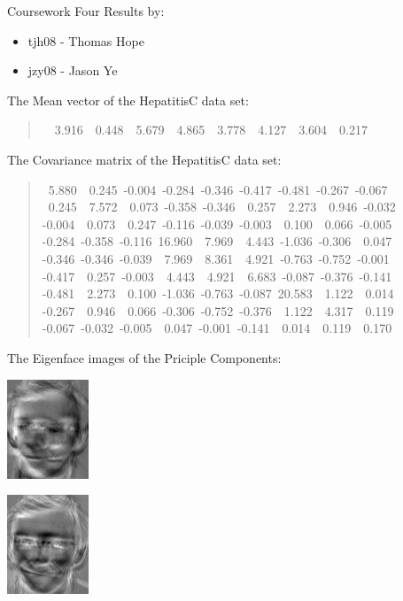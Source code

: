 \documentclass[a4paper]{article}
\begin{document}
Coursework Four Results by:
%
\begin{itemize}

\item tjh08 - Thomas Hope

\item jzy08 - Jason Ye

\end{itemize}

The Mean vector of the HepatitisC data set:
%
\begin{quote}{\ttfamily \raggedright {}~~3.916~~0.448~~5.679~~4.865~~3.778~~4.127~~3.604~~0.217
}
\end{quote}

The Covariance matrix of the HepatitisC data set:
%
\begin{quote}{\ttfamily \raggedright \noindent
~5.880~~0.245~-0.004~-0.284~-0.346~-0.417~-0.481~-0.267~-0.067\\
~0.245~~7.572~~0.073~-0.358~-0.346~~0.257~~2.273~~0.946~-0.032\\
-0.004~~0.073~~0.247~-0.116~-0.039~-0.003~~0.100~~0.066~-0.005\\
-0.284~-0.358~-0.116~16.960~~7.969~~4.443~-1.036~-0.306~~0.047\\
-0.346~-0.346~-0.039~~7.969~~8.361~~4.921~-0.763~-0.752~-0.001\\
-0.417~~0.257~-0.003~~4.443~~4.921~~6.683~-0.087~-0.376~-0.141\\
-0.481~~2.273~~0.100~-1.036~-0.763~-0.087~20.583~~1.122~~0.014\\
-0.267~~0.946~~0.066~-0.306~-0.752~-0.376~~1.122~~4.317~~0.119\\
-0.067~-0.032~-0.005~~0.047~-0.001~-0.141~~0.014~~0.119~~0.170
}
\end{quote}

The Eigenface images of the Priciple Components:

\includegraphics[scale=0.500000]{PrincipalComponent0.jpg}

\includegraphics[scale=0.500000]{PrincipalComponent1.jpg}
\end{document}
